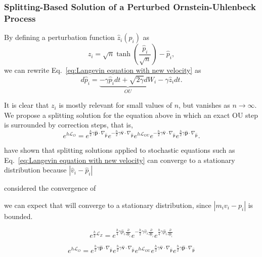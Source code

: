 \documentclass[
aip,
jcp,
reprint,
]{revtex4-1}
\newcommand{\vt}[1]{\boldsymbol{\mathbf{#1}}}          %
\newcommand{\diff}[2]{\frac{\partial #2}{\partial #1}} %
\newcommand{\timestep}{h}
\begin{document}
\subsubsection{Splitting-Based Solution of a Perturbed Ornstein-Uhlenbeck Process}

By defining a perturbation function $\hat{z}_i(\hat{p}_i)$ as
\begin{equation}
z_i = \sqrt{n} \tanh\left(\frac{\hat{p}_i}{\sqrt{n}}\right) - \hat{p}_i,
\end{equation}
we can rewrite Eq.~\eqref{eq:Langevin equation with new velocity} as
\begin{equation}
\label{eq:Langevin equation with perturbed OU process}
d\hat{p}_i = \underbrace{- \gamma \hat{p}_i dt + \sqrt{2 \gamma} dW_i}_{OU} - \gamma \hat{z}_i dt.
\end{equation}

It is clear that $z_i$ is mostly relevant for small values of $n$, but vanishes as $n \to \infty$.
We propose a splitting solution for the equation above in which an exact OU step is surrounded by correction steps, that is,
\begin{equation*}
e^{\timestep \mathcal{L}_O} =
e^{\frac{\timestep}{2} \gamma \hat{\vt p} \cdot \nabla_{\hat{\vt p}}}
e^{-\frac{\timestep}{2} \gamma \hat{\vt v} \cdot \nabla_{\hat{\vt p}}}
e^{\timestep \mathcal{L}_\mathrm{OU}}
e^{-\frac{\timestep}{2} \gamma \hat{\vt v} \cdot \nabla_{\hat{\vt p}}}
e^{\frac{\timestep}{2} \gamma \hat{\vt p} \cdot \nabla_{\hat{\vt p}}}.
\end{equation*}


\citeauthor{Stoltz_2018} \cite{Stoltz_2018} have shown that splitting solutions applied to stochastic equations such as Eq.~\eqref{eq:Langevin equation with new velocity} can converge to a stationary distribution because $|\hat{v}_i - \hat{p}_i|$ 

\cite{Trstanova_2016}

considered the convergence of


we can expect that will converge to a stationary distribution, since $| m_i v_i - p_i |$ is bounded.


\begin{equation}
e^{\frac{\timestep}{2} \mathcal{L}_{Z}} =
e^{\frac{\timestep}{4} \gamma \hat{p}_i \diff{\hat{p}_i}{}}
e^{-\frac{\timestep}{2}  \gamma \hat{v}_i \diff{\hat{p}_i}{}}
e^{\frac{\timestep}{4} \gamma \hat{p}_i \diff{\hat{p}_i}{}}
\end{equation}

\begin{equation*}
e^{\timestep \mathcal{L}_O} =
e^{\frac{\timestep}{2} \gamma \hat{\vt p} \cdot \nabla_{\hat{\vt p}}}
e^{\frac{\timestep}{2} \gamma \hat{\vt v} \cdot \nabla_{\hat{\vt p}}}
e^{\timestep \mathcal{L}_\mathrm{OU}}
e^{\frac{\timestep}{2} \gamma \hat{\vt v} \cdot \nabla_{\hat{\vt p}}}
e^{\frac{\timestep}{2} \gamma \hat{\vt p} \cdot \nabla_{\hat{\vt p}}}
\end{equation*}
\end{document}
